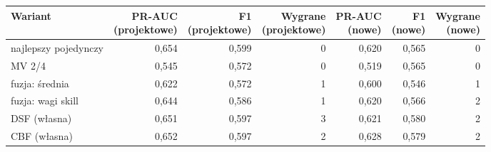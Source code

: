 \begin{tabular}{lrrrrrr}
\toprule
Wariant & \makecell[r]{PR-AUC\\(projektowe)} & \makecell[r]{F1\\(projektowe)} & \makecell[r]{Wygrane\\(projektowe)} & \makecell[r]{PR-AUC\\(nowe)} & \makecell[r]{F1\\(nowe)} & \makecell[r]{Wygrane\\(nowe)} \\
\midrule
najlepszy pojedynczy & 0,654 & 0,599 & 0 & 0,620 & 0,565 & 0 \\
MV 2/4 & 0,545 & 0,572 & 0 & 0,519 & 0,565 & 0 \\
fuzja: średnia & 0,622 & 0,572 & 1 & 0,600 & 0,546 & 1 \\
fuzja: wagi skill & 0,644 & 0,586 & 1 & 0,620 & 0,566 & 2 \\
DSF (własna) & 0,651 & 0,597 & 3 & 0,621 & 0,580 & 2 \\
CBF (własna) & 0,652 & 0,597 & 2 & 0,628 & 0,579 & 2 \\
\bottomrule
\end{tabular}
